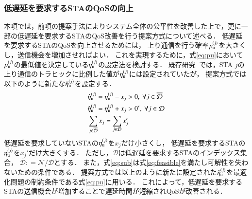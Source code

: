 \documentclass[master]{kuisthesis}		%
\newcommand{\etau}{\eta_{\rm u}^{(j)}}
\def\equiv{\mathrel{\mathop:}=}
\begin{document}
		\subsubsection{低遅延を要求するSTAのQoSの向上}\label{sec:qos}
			本項では，前項の提案手法によりシステム全体の公平性を改善した上で，更に一部の低遅延を要求するSTAのQoS改善を行う提案方式について述べる．
			低遅延を要求するSTAのQoSを向上させるためには，
			上り通信を行う確率$p_{\rm u}^{(j)}$を大きくし，送信機会を増加させればよい．
			これを実現するために，式\eqref{eq:pu}において$p_{\rm u}^{(j)}$の最低値を決定している$\etau$の設定法を検討する．
			既存研究~\cite{promac}では，STA $j$の上り通信のトラヒックに比例した値が$\etau$には設定されていたが，
			提案方式では以下のように新たな${\hat \eta}_{\rm u}^{(j)}$を設定する．
			\begin{align}
				&{\hat \eta}_{\rm u}^{(j)} = \etau -x_j>0,\ \forall j \in {\overline {\mathcal D}} \label{eq:new_etau_dbar}\\
				&{\hat \eta}_{\rm u}^{(j)} = \etau + x_j>0',\ \forall j \in {\mathcal D} \label{eq:new_etau_d}\\
				&\sum_{j\in{\overline {\mathcal D}}} x_j = \sum_{j\in{\mathcal D}} x_j' \label{eq:sub}
			\end{align}
			低遅延を要求していないSTAの$\etau$を$x_j$だけ小さくし，
			低遅延を要求するSTAの$\etau$を$x_j'$だけ大きくする．
			ただし，$\mathcal D$は低遅延を要求するSTAのインデックス集合，
			${\overline {\mathcal D}}\equiv{\mathcal N}/{\mathcal D}$とする．
			また，式\eqref{eq:sub}は式\eqref{eq:feasible}を満たし可解性を失わないための条件である．
			提案方式では以上のように新たに設定された${\hat \eta}_{\rm u}^{(j)}$を最適化問題の制約条件である式\eqref{eq:pu}に用いる．
			これによって，低遅延を要求するSTAの送信機会が増加することで遅延時間が短縮されQoSが改善される．
\end{document}
